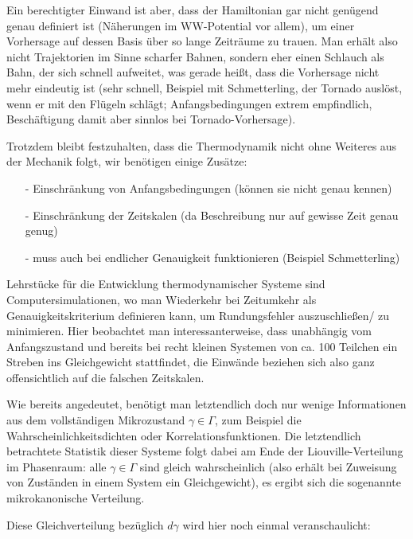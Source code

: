 Ein berechtigter Einwand ist aber, dass der Hamiltonian gar nicht genügend genau definiert ist (Näherungen im WW-Potential vor allem), um einer Vorhersage auf dessen Basis über so lange Zeiträume zu trauen. Man erhält also nicht Trajektorien im Sinne scharfer Bahnen, sondern eher einen Schlauch als Bahn, der sich schnell aufweitet, was gerade heißt, dass die Vorhersage nicht mehr eindeutig ist (sehr schnell, Beispiel mit Schmetterling, der Tornado auslöst, wenn er mit den Flügeln schlägt; Anfangsbedingungen extrem empfindlich, Beschäftigung damit aber sinnlos bei Tornado-Vorhersage).

Trotzdem bleibt festzuhalten, dass die Thermodynamik nicht ohne Weiteres aus der Mechanik folgt, wir benötigen einige Zusätze:
\begin{itemize}
\item[-] Einschränkung von Anfangsbedingungen (können sie nicht genau kennen)
\item[-] Einschränkung der Zeitskalen (da Beschreibung nur auf gewisse Zeit genau genug)
\item[-] muss auch bei endlicher Genauigkeit funktionieren (Beispiel Schmetterling)
\end{itemize}

Lehrstücke für die Entwicklung thermodynamischer Systeme sind Computersimulationen, wo man Wiederkehr bei Zeitumkehr als Genauigkeitskriterium definieren kann, um Rundungsfehler auszuschließen/ zu minimieren. Hier beobachtet man interessanterweise, dass unabhängig vom Anfangszustand und bereits bei recht kleinen Systemen von ca. 100 Teilchen ein Streben ins Gleichgewicht stattfindet, die Einwände beziehen sich also ganz offensichtlich auf die falschen Zeitskalen.

Wie bereits angedeutet, benötigt man letztendlich doch nur wenige Informationen aus dem vollständigen Mikrozustand $\gamma \in \Gamma$, zum Beispiel die Wahrscheinlichkeitsdichten oder Korrelationsfunktionen. Die letztendlich betrachtete Statistik dieser Systeme folgt dabei am Ende der Liouville-Verteilung im Phasenraum: alle $\gamma \in \Gamma$ sind gleich wahrscheinlich (also erhält bei Zuweisung von Zuständen in einem System ein Gleichgewicht), es ergibt sich die sogenannte mikrokanonische Verteilung.

Diese Gleichverteilung bezüglich $d\gamma$ wird hier noch einmal veranschaulicht:

\begin{center}
\label{fig:zeitentw}
\end{center}

